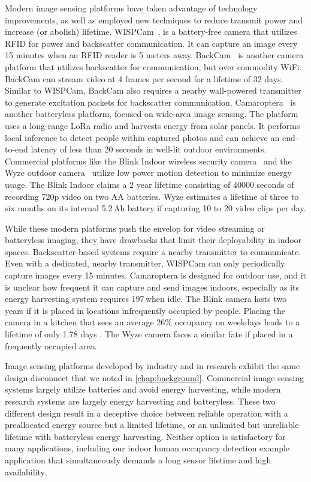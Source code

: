 Modern image sensing platforms have taken advantage of technology improvements, as well as employed new techniques to reduce transmit power and increase (or abolish) lifetime. WISPCam~\cite{naderiparizi2015wispcam}, is a battery-free camera that utilizes RFID for power and backscatter communication. It can capture an image every 15 minutes when an RFID reader is 5 meters away. BackCam~\cite{josephson2019wireless} is  another camera platform that utilizes backscatter for communication, but over commodity WiFi. BackCam can stream video at 4 frames per second for a lifetime of 32 days. Similar to WISPCam, BackCam also requires a nearby wall-powered transmitter to generate excitation packets for backscatter communication. Camaroptera~\cite{nardello2019camaroptera} is another batteryless platform, focused on wide-area image sensing. 
The platform uses a long-range LoRa radio and harvests energy from solar panels. It performs local inference to detect people within captured photos and can achieve an end-to-end latency of less than 20 seconds in well-lit outdoor environments. Commercial platforms like the Blink Indoor wireless security camera~\cite{blinkindoor} and the Wyze outdoor camera~\cite{wyzeoutdoor} utilize low power motion detection to minimize energy usage. The Blink Indoor claims a 2 year lifetime consisting of 40000 seconds of recording 720p video on two AA batteries. Wyze estimates a lifetime of three to six months on its internal 5.2\,Ah battery if capturing 10 to 20 video clips per day.

While these modern platforms push the envelop for video streaming or batteryless imaging, they have drawbacks that limit their deployability in indoor spaces. Backscatter-based systems require a nearby transmitter to communicate. Even with a dedicated, nearby transmitter, WISPCam can only periodically capture images every 15 minutes. Camaroptera is designed for outdoor use, and it is unclear how frequent it can capture and send images indoors, especially as its energy harvesting system requires 197\,\uW when idle. 
The Blink camera lasts two years if it is placed in locations infrequently occupied by people. Placing the camera in a kitchen that sees an average 26\% occupancy on weekdays leads to a lifetime of only 1.78 days \cite{josephson2019wireless}. The Wyze camera faces a similar fate if placed in a frequently occupied area.

Image sensing platforms developed by industry and in research exhibit the same design disconnect that we noted in \cref{chap:background}. Commercial image sensing systems largely utilize batteries and avoid energy harvesting, while modern research systems are largely energy harvesting and batteryless.
These two different design result in a deceptive choice between reliable operation with a preallocated energy source but a limited lifetime, or an unlimited but unreliable lifetime with batteryless energy harvesting.
Neither option is satisfactory for many applications, including our indoor human occupancy detection example application that simultaneously demands a long sensor lifetime and high availability.

